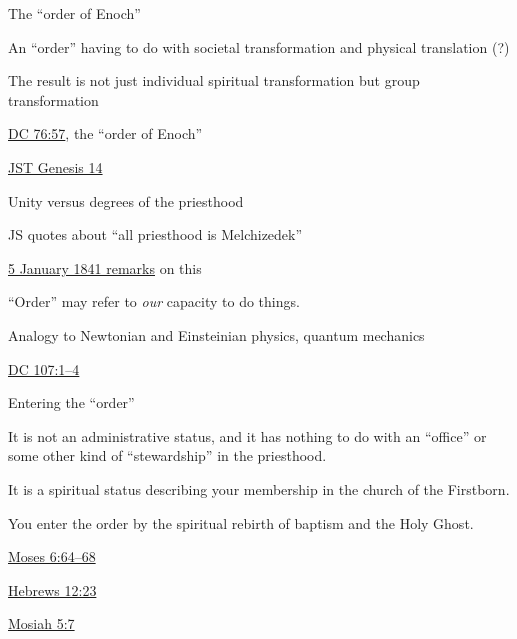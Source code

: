 \begin{compactitem}
			\item The ``order of Enoch''
				\begin{compactitem}
					\item An ``order'' having to do with societal transformation and physical translation (?)
					\item The result is not just individual spiritual transformation but group transformation
					\item \hyperref[DC76-57]{DC 76:57}, the ``order of Enoch''
					\item \hyperref[JST-OTR1-GENESIS-14]{JST Genesis 14}
				\end{compactitem}
				
			\item Unity versus degrees of the priesthood
				\begin{compactitem}
					\item JS quotes about ``all priesthood is Melchizedek''
					\item \hyperlink{EMS-1841-JS-5-JAN-1841-WC-b}{5 January 1841 remarks} on this
					\item ``Order'' may refer to \textit{our} capacity to do things.
					\item Analogy to Newtonian and Einsteinian physics, quantum mechanics
					\item \hyperref[DC107-1]{DC 107:1--4}
				\end{compactitem}
				
			\item Entering the ``order''
				\begin{compactitem}
					\item It is not an administrative status, and it has nothing to do with an ``office'' or some other kind of ``stewardship'' in the priesthood.
					\item It is a spiritual status describing your membership in the church of the Firstborn.
					\item You enter the order by the spiritual rebirth of baptism and the Holy Ghost.
						\begin{compactitem}
							\item \hyperref[MOSES-6-64]{Moses 6:64--68}
							\item \hyperref[HEBREWS-12-23]{Hebrews 12:23}
							\item \hyperref[MOSIAH-5-7]{Mosiah 5:7}
						\end{compactitem}
				\end{compactitem}
				

\end{compactitem}
